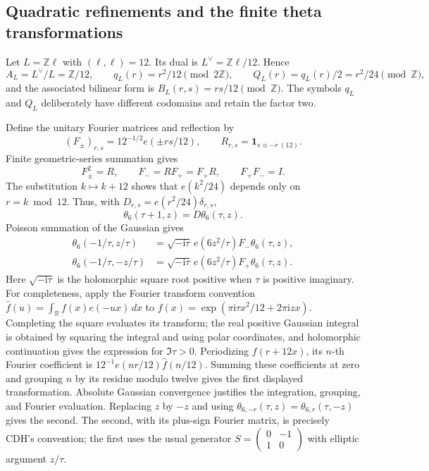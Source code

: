 \subsection{Quadratic refinements and the finite theta transformations}

Let $L=\mathbb Z\ell$ with $(\ell,\ell)=12$.  Its dual is
$L^\vee=\mathbb Z\ell/12$.  Hence
\[
 A_L=L^\vee/L=\mathbb Z/12,\qquad
 q_L(r)=r^2/12\pmod{2\mathbb Z},\qquad
 Q_L(r)=q_L(r)/2=r^2/24\pmod{\mathbb Z},
\]
and the associated bilinear form is $B_L(r,s)=rs/12\pmod{\mathbb Z}$.
The symbols $q_L$ and $Q_L$ deliberately have different codomains and
retain the factor two.

Define the unitary Fourier matrices and reflection by
\[
 (F_\pm)_{r,s}=12^{-1/2}e(\pm rs/12),\qquad
 R_{r,s}=\mathbf1_{s\equiv-r\ (12)}.
\]
Finite geometric-series summation gives
\[
 F_\pm^2=R,\qquad F_-=RF_+=F_+R,\qquad F_+F_-=I.
\]
The substitution $k\mapsto k+12$ shows that $e(k^2/24)$ depends only on
$r=k\bmod12$.  Thus, with
$D_{r,s}=e(r^2/24)\delta_{r,s}$,
\[
 \theta_6(\tau+1,z)=D\theta_6(\tau,z).
\]
Poisson summation of the Gaussian gives
\begin{align*}
 \theta_6(-1/\tau,z/\tau)
 &=\sqrt{-\mathrm i\tau}\,e(6z^2/\tau)F_-\theta_6(\tau,z),\\
 \theta_6(-1/\tau,-z/\tau)
 &=\sqrt{-\mathrm i\tau}\,e(6z^2/\tau)F_+\theta_6(\tau,z).
\end{align*}
Here $\sqrt{-\mathrm i\tau}$ is the holomorphic square root positive
when $\tau$ is positive imaginary.  For completeness, apply the Fourier
transform convention $\widehat f(u)=\int_{\mathbb R}f(x)e(-ux)\,dx$
to $f(x)=\exp(\pi\mathrm i\tau x^2/12+2\pi\mathrm i zx)$.
Completing the square evaluates its transform; the real positive Gaussian
integral is obtained by squaring the integral and using polar coordinates,
and holomorphic continuation gives the expression for $\Im\tau>0$.
Periodizing $f(r+12x)$, its $n$-th Fourier coefficient is
$12^{-1}e(nr/12)\widehat f(n/12)$.  Summing these coefficients at zero
and grouping $n$ by its residue modulo twelve gives the first displayed
transformation.  Absolute Gaussian convergence justifies the integration,
grouping, and Fourier evaluation.  Replacing $z$ by $-z$ and using
$\theta_{6,-r}(\tau,z)=\theta_{6,r}(\tau,-z)$ gives the second.
The second, with its plus-sign Fourier matrix, is precisely CDH's
convention; the first uses the usual generator
$S=\left(\begin{smallmatrix}0&-1\\1&0\end{smallmatrix}\right)$
with elliptic argument $z/\tau$.

